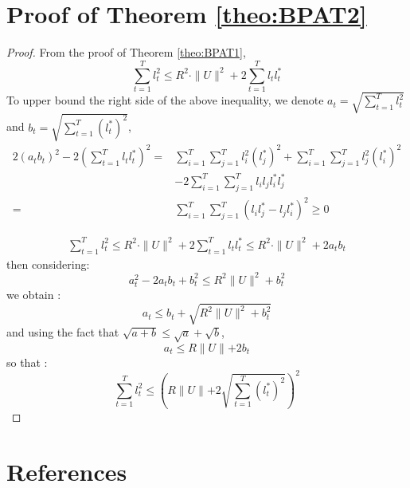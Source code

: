 \documentclass[preprint,12pt,authoryear]{elsarticle}
\begin{document}
\section{Proof of Theorem \ref{theo:BPAT2}}\label{app:thm2}
\begin{proof}
	From the proof of Theorem \ref{theo:BPAT1}, 
	\[\sum_{t=1}^{T}l_t^2 \leqslant R^2\cdot \parallel{U}\parallel^2 + 2\sum_{t=1}^{T}l_t l_t^{\ast}\]
	To upper bound the right side of the above inequality, we denote $a_t = \sqrt{\sum_{t=1}^{T}l_t^2}$ and $b_t = \sqrt{\sum_{t=1}^{T}(l_t^{\ast})^2}$, 
	\begin{align}
	2(a_tb_t)^2-2(\sum_{t=1}^{T}l_tl_t^{\ast})^2 =& \sum_{i=1}^{T}\sum_{j=1}^{T}l_i^2(l_j^{\ast})^2+\sum_{i=1}^{T}\sum_{j=1}^{T}l_j^2(l_i^{\ast})^2 \nonumber\\
	&- 2\sum_{i=1}^{T}\sum_{j=1}^{T}l_il_jl_i^{\ast}l_j^{\ast}\nonumber\\
	=& \sum_{i=1}^{T}\sum_{j=1}^{T}(l_il_j^{\ast}-l_jl_i^{\ast})^2 \geqslant 0 \nonumber
	\end{align}
	
	\begin{align}
	\sum_{t=1}^{T}l_t^2 \leqslant R^2 \cdot \parallel{U}\parallel^2+2\sum_{t=1}^{T}l_tl_t^{\ast}\leqslant R^2 \cdot \parallel{U}\parallel^2+2a_tb_t\nonumber
	\end{align}
	then considering:
	\[a_t^2 -2 a_tb_t+b_t^2\leqslant R^2\parallel{U}\parallel^2+b_t^2\]
	we obtain :
	\[a_t \leqslant b_t+\sqrt{R^2\parallel{U}\parallel^2+b_t^2}\]
	and using the fact that $\sqrt{a+b}\leqslant \sqrt{a}+\sqrt{b}$,
	\[a_t \leqslant R\parallel{U}\parallel+2 b_t\]
	so that :
	\[\sum_{t=1}^{T}l_t^2 \leqslant \left(R\parallel{U}\parallel+2 \sqrt{\sum_{t=1}^{T}(l_t^{\ast})^2}\right)^2 \]
\end{proof}
\section*{References}
 

\end{document}
